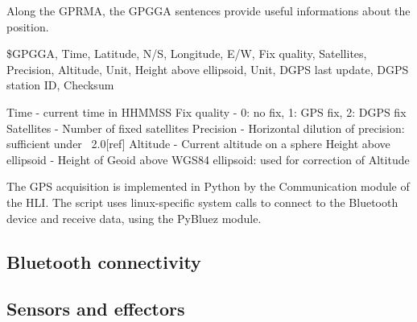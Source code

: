 Along the GPRMA, the GPGGA sentences provide useful informations about the position.

\$GPGGA, Time, Latitude, N/S, Longitude, E/W, Fix quality, Satellites, Precision, Altitude, Unit, Height above ellipsoid, Unit, DGPS last update, DGPS station ID, Checksum

Time - current time in HHMMSS
Fix quality - 0: no fix, 1: GPS fix, 2: DGPS fix
Satellites - Number of fixed satellites
Precision - Horizontal dilution of precision: sufficient under ~2.0[ref]
Altitude - Current altitude on a sphere
Height above ellipsoid - Height of Geoid above WGS84 ellipsoid: used for correction of Altitude

The GPS acquisition is implemented in Python by the Communication module of the HLI. The script uses linux-specific system calls to connect to the Bluetooth device and receive data, using the PyBluez module.

\subsection{Bluetooth connectivity}

\subsection{Sensors and effectors}
